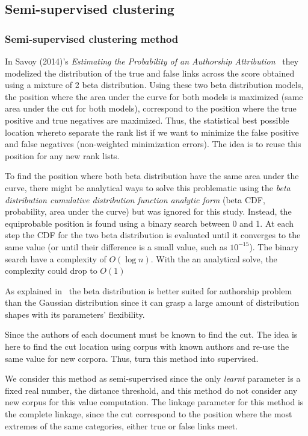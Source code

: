 \subsection{Semi-supervised clustering}

\subsubsection{Semi-supervised clustering method}

In Savoy (2014)'s \textit{Estimating the Probability of an Authorship Attribution}~\cite{savoy_probability} they modelized the distribution of the true and false links across the score obtained using a mixture of 2 beta distribution.
Using these two beta distribution models, the position where the area under the curve for both models is maximized (same area under the cut for both models), correspond to the position where the true positive and true negatives are maximized.
Thus, the statistical best possible location whereto separate the rank list if we want to minimize the false positive and false negatives (non-weighted minimization errors).
The idea is to reuse this position for any new rank lists.

To find the position where both beta distribution have the same area under the curve, there might be analytical ways to solve this problematic using the \textit{beta distribution cumulative distribution function analytic form} (beta CDF, probability, area under the curve) but was ignored for this study.
Instead, the equiprobable position is found using a binary search between 0 and 1.
At each step the CDF for the two beta distribution is evaluated until it converges to the same value (or until their difference is a small value, such as $10^{-15}$).
The binary search have a complexity of $O(\log n)$.
With the an analytical solve, the complexity could drop to $O(1)$

As explained in~\cite{savoy_probability} the beta distribution is better suited for authorship problem than the Gaussian distribution since it can grasp a large amount of distribution shapes with its parameters' flexibility.

Since the authors of each document must be known to find the cut.
The idea is here to find the cut location using corpus with known authors and re-use the same value for new corpora.
Thus, turn this method into supervised.

We consider this method as semi-supervised since the only \textit{learnt} parameter is a fixed real number, the distance threshold, and this method do not consider any new corpus for this value computation.
The linkage parameter for this method is the complete linkage, since the cut correspond to the position where the most extremes of the same categories, either true or false links meet.

